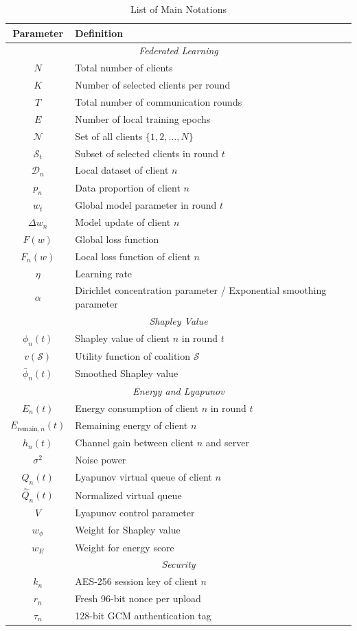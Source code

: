 \begin{table}[t]
\centering
\caption{List of Main Notations}
\label{tab:notation}
\begin{tabular}{cl}
\hline
\textbf{Parameter} & \textbf{Definition} \\
\hline
\multicolumn{2}{c}{\textit{Federated Learning}} \\
$N$ & Total number of clients \\
$K$ & Number of selected clients per round \\
$T$ & Total number of communication rounds \\
$E$ & Number of local training epochs \\
$\mathcal{N}$ & Set of all clients $\{1, 2, \ldots, N\}$ \\
$\mathcal{S}_t$ & Subset of selected clients in round $t$ \\
$\mathcal{D}_n$ & Local dataset of client $n$ \\
$p_n$ & Data proportion of client $n$ \\
$w_t$ & Global model parameter in round $t$ \\
$\Delta w_n$ & Model update of client $n$ \\
$F(w)$ & Global loss function \\
$F_n(w)$ & Local loss function of client $n$ \\
$\eta$ & Learning rate \\
$\alpha$ & Dirichlet concentration parameter / Exponential smoothing parameter \\
\hline
\multicolumn{2}{c}{\textit{Shapley Value}} \\
$\phi_n(t)$ & Shapley value of client $n$ in round $t$ \\
$v(\mathcal{S})$ & Utility function of coalition $\mathcal{S}$ \\
$\bar{\phi}_n(t)$ & Smoothed Shapley value \\
\hline
\multicolumn{2}{c}{\textit{Energy and Lyapunov}} \\
$E_n(t)$ & Energy consumption of client $n$ in round $t$ \\
$E_{\text{remain},n}(t)$ & Remaining energy of client $n$ \\
$h_n(t)$ & Channel gain between client $n$ and server \\
$\sigma^2$ & Noise power \\
$Q_n(t)$ & Lyapunov virtual queue of client $n$ \\
$\hat{Q}_n(t)$ & Normalized virtual queue \\
$V$ & Lyapunov control parameter \\
$w_{\phi}$ & Weight for Shapley value \\
$w_E$ & Weight for energy score \\
\hline
\multicolumn{2}{c}{\textit{Security}} \\
$k_n$ & AES-256 session key of client $n$ \\
$r_n$ & Fresh 96-bit nonce per upload \\
$\tau_n$ & 128-bit GCM authentication tag \\
\hline
\end{tabular}
\end{table}

